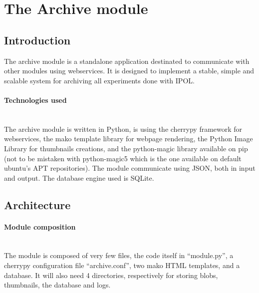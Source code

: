 \section{The Archive module}

\subsection{Introduction}
\label{sec:archive_introduction}

The archive module is a standalone application destinated to communicate with other modules using webservices. It is designed to implement a stable, simple and scalable system for archiving all experiments done with IPOL.

\paragraph{Technologies used} \hspace{0pt} \\
The archive module is written in Python, is using the cherrypy framework for webservices, the mako template library for webpage rendering, the Python Image Library for thumbnails creations, and the python-magic library available on pip (not to be mistaken with python-magic5 which is the one available on default ubuntu's APT repositories). The module communicate using JSON, both in input and output. The database engine used is SQLite.

\subsection{Architecture}

\paragraph{Module composition} \hspace{0pt} \\
The module is composed of very few files, the code itself in ``module.py'', a cherrypy configuration file ``archive.conf'', two mako HTML templates, and a database. It will also need 4 directories, respectively for storing blobs, thumbnails, the database and logs.

